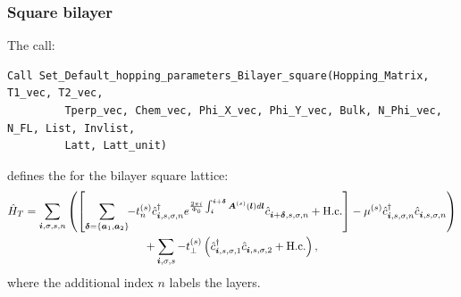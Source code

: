 \subsubsection*{Square bilayer}
The call:
\begin{lstlisting}[style=fortran]
Call Set_Default_hopping_parameters_Bilayer_square(Hopping_Matrix, T1_vec, T2_vec,
         Tperp_vec, Chem_vec, Phi_X_vec, Phi_Y_vec, Bulk, N_Phi_vec, N_FL, List, Invlist,
         Latt, Latt_unit)
\end{lstlisting}  
defines  the   for the  bilayer  square  lattice:       
\begin{multline}
\hat{H}_T  =    \sum_{\boldsymbol{i}, \sigma, s,n } \left(    \left[  \sum_{ \boldsymbol{\delta} = \left\{ \boldsymbol{a}_1, \boldsymbol{a}_2\right\} } \!\! - t_n^{(s)} \hat{c}^{\dagger}_{\boldsymbol{i},s,\sigma,n}   e^{\frac{2 \pi i}{\Phi_0} \int_{\boldsymbol{i}}^{\boldsymbol{i}+ \boldsymbol{\delta}}  \boldsymbol{A}^{(s)}(\boldsymbol{l})  d \boldsymbol{l}}   \hat{c}^{}_{\boldsymbol{i} + \boldsymbol{\delta},s,\sigma,n} +  \mathrm{H.c.} \right]       -  \mu^{(s)} \hat{c}^{\dagger}_{\boldsymbol{i},s,\sigma,n} \hat{c}^{}_{\boldsymbol{i},s,\sigma,n}  \right)   \\
     + \sum_{\boldsymbol{i}, \sigma, s } -  t_{\perp}^{(s)}  \left( \hat{c}^{\dagger}_{\boldsymbol{i},s,\sigma,1} \hat{c}^{}_{\boldsymbol{i},s,\sigma,2}  + \mathrm{H.c.} \right), 
\end{multline}
where the additional  index  $n$  labels the layers.


